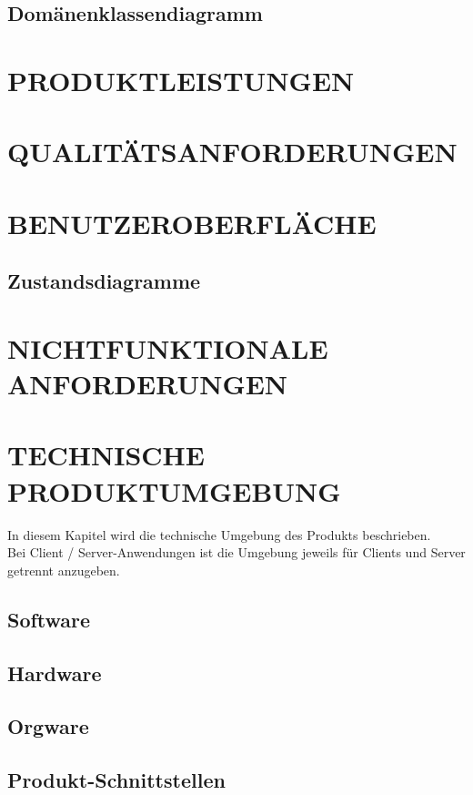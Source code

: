 	\subsection{Domänenklassendiagramm}
	
	\section{\Large PRODUKTLEISTUNGEN}
	
	\section{\Large QUALITÄTSANFORDERUNGEN}
	
	
	\section{\Large BENUTZEROBERFLÄCHE}
	
	\subsection{Zustandsdiagramme}
	
	\section{\Large NICHTFUNKTIONALE ANFORDERUNGEN}
	

	
	\section{\Large TECHNISCHE PRODUKTUMGEBUNG}
   	In diesem Kapitel wird die technische Umgebung des Produkts beschrieben.\\
   	Bei Client / Server-Anwendungen ist die Umgebung jeweils für Clients und Server getrennt anzugeben.
	\subsection{Software}
	
	\subsection{Hardware}
	
	\subsection{Orgware}
	
	\subsection{Produkt-Schnittstellen}

